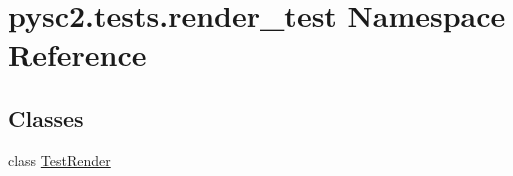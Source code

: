 \hypertarget{namespacepysc2_1_1tests_1_1render__test}{}\section{pysc2.\+tests.\+render\+\_\+test Namespace Reference}
\label{namespacepysc2_1_1tests_1_1render__test}
\subsection*{Classes}
\begin{DoxyCompactItemize}
\item 
class \mbox{\hyperlink{classpysc2_1_1tests_1_1render__test_1_1_test_render}{Test\+Render}}
\end{DoxyCompactItemize}
